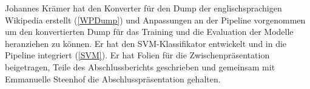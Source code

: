 Johannes Krämer hat den Konverter für den Dump der englischsprachigen Wikipedia erstellt (\ref{WPDump}) und Anpassungen an der Pipeline vorgenommen um den konvertierten Dump für das Training und die Evaluation der Modelle heranziehen zu können. Er hat den SVM-Klassifikator entwickelt und in die Pipeline integriert (\ref{SVM}). Er hat Folien für die Zwischenpräsentation beigetragen, Teile des Abschlussberichts geschrieben und gemeinsam mit Emmanuelle Steenhof die Abschlusspräsentation gehalten.